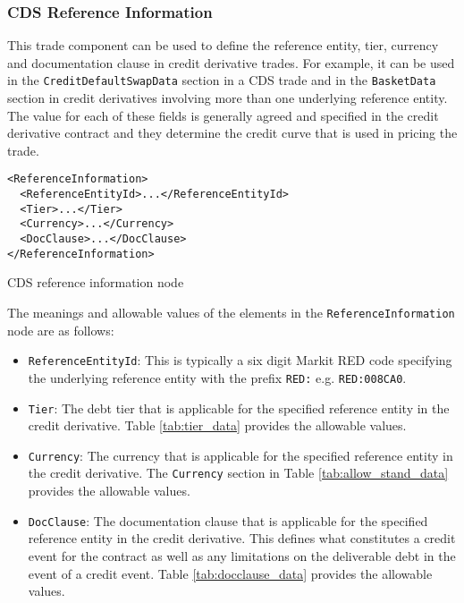 \subsubsection{CDS Reference Information}
\label{ss:cds_reference_information} 

This trade component can be used to define the reference entity, tier, currency and documentation clause in credit derivative trades. For example, it can be used in the \lstinline!CreditDefaultSwapData! section in a CDS trade and in the \lstinline!BasketData! section in credit derivatives involving more than one underlying reference entity. The value for each of these fields is generally agreed and specified in the credit derivative contract and they determine the credit curve that is used in pricing the trade.

\begin{listing}[H]
\begin{verbatim}
<ReferenceInformation>
  <ReferenceEntityId>...</ReferenceEntityId>
  <Tier>...</Tier>
  <Currency>...</Currency>
  <DocClause>...</DocClause>
</ReferenceInformation>
\end{verbatim}
\caption{CDS reference information node}
\label{lst:cds_reference_information}
\end{listing}

The meanings and allowable values of the elements in the \lstinline!ReferenceInformation! node are as follows:

\begin{itemize}

\item \lstinline!ReferenceEntityId!:
This is typically a six digit Markit RED code specifying the underlying reference entity with the prefix \lstinline!RED:! e.g. \lstinline!RED:008CA0!.

\item \lstinline!Tier!:
The debt tier that is applicable for the specified reference entity in the credit derivative. Table \ref{tab:tier_data} provides the allowable values.

\item \lstinline!Currency!:
The currency that is applicable for the specified reference entity in the credit derivative. The \lstinline!Currency! section in Table \ref{tab:allow_stand_data} provides the allowable values.

\item \lstinline!DocClause!:
The documentation clause that is applicable for the specified reference entity in the credit derivative. This defines what constitutes a credit event for the contract as well as any limitations on the deliverable debt in the event of a credit event. Table \ref{tab:docclause_data} provides the allowable values.

\end{itemize}

